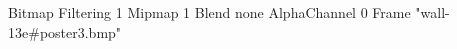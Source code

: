 {Bitmap
	{Filtering 1}
	{Mipmap 1}
	{Blend none}
	{AlphaChannel 0}
	{Frame "wall-13e#poster3.bmp"}
}
